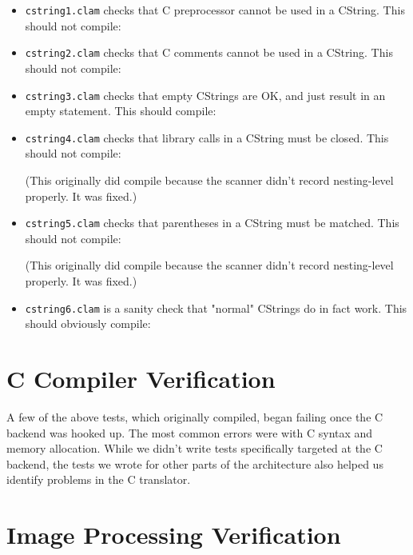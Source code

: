 \begin{itemize}

\item\texttt{cstring1.clam} checks that C preprocessor cannot be used in a CString. This should not compile:


\item\texttt{cstring2.clam} checks that C comments cannot be used in a CString. This should not compile:


\item\texttt{cstring3.clam} checks that empty CStrings are OK, and just result in an empty statement. This should compile:


\item\texttt{cstring4.clam} checks that library calls in a CString must be closed. This should not compile:

(This originally did compile because the scanner didn't record nesting-level properly. It was fixed.)

\item\texttt{cstring5.clam} checks that parentheses in a CString must be matched. This should not compile:

(This originally did compile because the scanner didn't record nesting-level properly. It was fixed.)

\item\texttt{cstring6.clam} is a sanity check that "normal" CStrings do in fact work. This should obviously compile:


\end{itemize}

\section{C Compiler Verification}
\label{testing:ccompiler}

A few of the above tests, which originally compiled, began failing once the C backend was hooked up.
The most common errors were with C syntax and memory allocation.
While we didn't write tests specifically targeted at the C backend,
the tests we wrote for other parts of the architecture also helped us identify problems in the C translator. 

\section{Image Processing Verification}
\label{testing:output}

